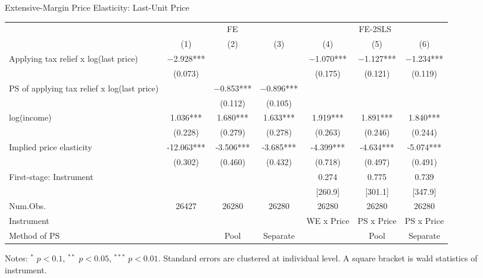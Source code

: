 \documentclass[
  ignorenonframetext,
  aspectratio=169,
]{beamer}
\begin{document}
\begin{frame}{Extensive-Margin Price Elasticity: Last-Unit Price}
\protect\hypertarget{extensive-margin-price-elasticity-last-unit-price}{}
\begin{table}[!h]
\centering
\fontsize{8}{10}\selectfont
\begin{threeparttable}
\begin{tabular}[t]{>{\raggedright\arraybackslash}p{10em}cccccc}
\toprule
\multicolumn{1}{c}{ } & \multicolumn{3}{c}{FE} & \multicolumn{3}{c}{FE-2SLS} \\
\cmidrule(l{3pt}r{3pt}){2-4} \cmidrule(l{3pt}r{3pt}){5-7}
  & (1) & (2) & (3) & (4) & (5) & (6)\\
\midrule
Applying tax relief x log(last price) & \num{-2.928}*** &  &  & \num{-1.070}*** & \num{-1.127}*** & \num{-1.234}***\\
 & (\num{0.073}) &  &  & (\num{0.175}) & (\num{0.121}) & (\num{0.119})\\
PS of applying tax relief x log(last price) &  & \num{-0.853}*** & \num{-0.896}*** &  &  & \\
 &  & (\num{0.112}) & (\num{0.105}) &  &  & \\
log(income) & \num{1.036}*** & \num{1.680}*** & \num{1.633}*** & \num{1.919}*** & \num{1.891}*** & \num{1.840}***\\
 & (\num{0.228}) & (\num{0.279}) & (\num{0.278}) & (\num{0.263}) & (\num{0.246}) & (\num{0.244})\\
\midrule
Implied price elasticity & -12.063*** & -3.506*** & -3.685*** & -4.399*** & -4.634*** & -5.074***\\
 & (0.302) & (0.460) & (0.432) & (0.718) & (0.497) & (0.491)\\
First-stage: Instrument &  &  &  & 0.274 & 0.775 & 0.739\\
 &  &  &  & {}[260.9] & {}[301.1] & {}[347.9]\\
Num.Obs. & \num{26427} & \num{26280} & \num{26280} & \num{26280} & \num{26280} & \num{26280}\\
Instrument &  &  &  & WE x Price & PS x Price & PS x Price\\
Method of PS &  & Pool & Separate &  & Pool & Separate\\
\bottomrule
\end{tabular}
\begin{tablenotes}
\item Notes: $^{*}$ $p < 0.1$, $^{**}$ $p < 0.05$, $^{***}$ $p < 0.01$. Standard errors are clustered at individual level. A square bracket is wald statistics of instrument.
\end{tablenotes}
\end{threeparttable}
\end{table}
\end{frame}
\end{document}
